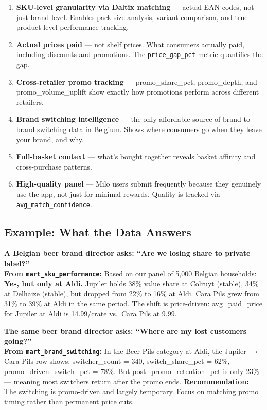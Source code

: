 \documentclass[11pt,a4paper]{article}
\begin{document}
\begin{enumerate}[leftmargin=1.5em, itemsep=3pt]
  \item \textbf{SKU-level granularity via Daltix matching} --- actual EAN codes, not just brand-level. Enables pack-size analysis, variant comparison, and true product-level performance tracking.
  \item \textbf{Actual prices paid} --- not shelf prices. What consumers actually paid, including discounts and promotions. The \texttt{price\_gap\_pct} metric quantifies the gap.
  \item \textbf{Cross-retailer promo tracking} --- promo\_share\_pct, promo\_depth, and promo\_volume\_uplift show exactly how promotions perform across different retailers.
  \item \textbf{Brand switching intelligence} --- the only affordable source of brand-to-brand switching data in Belgium. Shows where consumers go when they leave your brand, and why.
  \item \textbf{Full-basket context} --- what's bought together reveals basket affinity and cross-purchase patterns.
  \item \textbf{High-quality panel} --- Milo users submit frequently because they genuinely use the app, not just for minimal rewards. Quality is tracked via \texttt{avg\_match\_confidence}.
\end{enumerate}

\subsection{Example: What the Data Answers}

\begin{qabox}
\textbf{A Belgian beer brand director asks: ``Are we losing share to private label?''}\\[4pt]
{\small\color{milogray} \textbf{From \texttt{mart\_sku\_performance}:} Based on our panel of 5,000 Belgian households: \textbf{Yes, but only at Aldi.} Jupiler holds 38\% value share at Colruyt (stable), 34\% at Delhaize (stable), but dropped from 22\% to 16\% at Aldi. Cara Pils grew from 31\% to 39\% at Aldi in the same period. The shift is price-driven: avg\_paid\_price for Jupiler at Aldi is \texteuro{}14.99/crate vs.\ Cara Pils at \texteuro{}9.99.}
\end{qabox}

\vspace{0.3em}

\begin{qabox}
\textbf{The same beer brand director asks: ``Where are my lost customers going?''}\\[4pt]
{\small\color{milogray} \textbf{From \texttt{mart\_brand\_switching}:} In the Beer Pils category at Aldi, the Jupiler $\rightarrow$ Cara Pils row shows: switcher\_count = 340, switch\_share\_pct = 62\%, promo\_driven\_switch\_pct = 78\%. But post\_promo\_retention\_pct is only 23\% --- meaning most switchers return after the promo ends. \textbf{Recommendation:} The switching is promo-driven and largely temporary. Focus on matching promo timing rather than permanent price cuts.}
\end{qabox}
\end{document}
